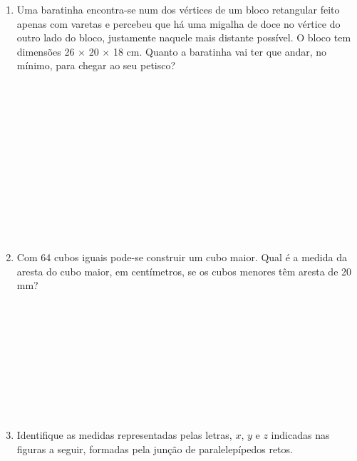 \documentclass[a4paper,14pt]{article}
\begin{document}
\begin{multicols}{2}
\begin{enumerate}
			\item Uma baratinha encontra-se num dos vértices de um bloco retangular feito apenas com varetas e percebeu que há uma migalha de doce no vértice do outro lado do bloco, justamente naquele mais distante possível. O bloco tem dimensões 26 $\times$ 20 $\times$ 18 cm. Quanto a baratinha vai ter que andar, no mínimo, para chegar ao seu petisco? \\\\\\\\\\\\\\\\\\\\\\\\\\
			\item Com 64 cubos iguais pode-se construir um cubo maior. Qual é a medida da aresta do cubo maior, em centímetros, se os cubos menores têm aresta de 20 mm? \\\\\\\\\\\\\\\\\\\\
			\item Identifique as medidas representadas pelas letras, $x$, $y$ e $z$ indicadas nas figuras a seguir, formadas pela junção de paralelepípedos retos. \\

\end{enumerate}
\end{multicols}
\end{document}
